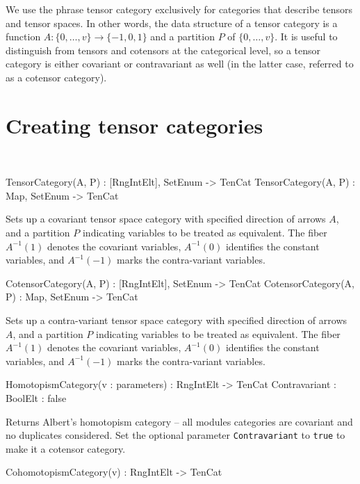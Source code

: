 We use the phrase tensor category exclusively for categories that describe tensors and tensor spaces.
In other words, the data structure of a tensor category is a function 
$A:\{0,\dots,v\}\rightarrow \{-1,0,1\}$ and a partition $P$ of $\{0,\dots,v\}$.
It is useful to distinguish from tensors and cotensors at the categorical level,
so a tensor category is either covariant or contravariant as well 
(in the latter case, referred to as a cotensor category).

\section{Creating tensor categories}~

\begin{intrinsics}
TensorCategory(A, P) : [RngIntElt], {SetEnum} -> TenCat
TensorCategory(A, P) : Map, {SetEnum} -> TenCat
\end{intrinsics}

Sets up a covariant tensor space category with specified direction of
arrows $A$, and a partition $P$ indicating variables to be treated as
equivalent.  The fiber $A^{-1}(1)$ denotes the covariant variables,
$A^{-1}(0)$ identifies the constant variables, and $A^{-1}(-1)$ marks
the contra-variant variables.  

\begin{intrinsics}
CotensorCategory(A, P) : [RngIntElt], {SetEnum} -> TenCat
CotensorCategory(A, P) : Map, {SetEnum} -> TenCat
\end{intrinsics}

Sets up a contra-variant tensor space category with specified direction of
arrows $A$, and a partition $P$ indicating variables to be treated as
equivalent.  The fiber $A^{-1}(1)$ denotes the covariant variables,
$A^{-1}(0)$ identifies the constant variables, and $A^{-1}(-1)$ marks
the contra-variant variables.  

\begin{intrinsics}
HomotopismCategory(v : parameters) : RngIntElt -> TenCat
    Contravariant : BoolElt : false
\end{intrinsics}

Returns Albert's homotopism category -- all modules categories are covariant 
and 
no duplicates considered.
Set the optional parameter {\tt Contravariant} to {\tt true} to make it a cotensor category.

\begin{intrinsics}
CohomotopismCategory(v) : RngIntElt -> TenCat
\end{intrinsics}

